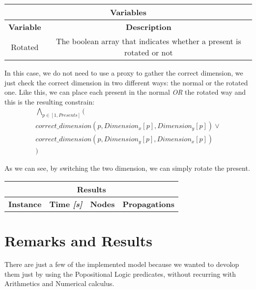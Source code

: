 \begin{center}
    \begin{tabular}{|c|c|}
        \hline
        \multicolumn{2}{|c|}{\textbf{Variables}} \\
        \hline
        \textbf{Variable} & {\textbf{Description}} \\
        \hline
        Rotated & The boolean array that indicates whether a present is rotated or not \\
        \hline
    \end{tabular}
\end{center}

In this case, we do not need to use a proxy to gather the correct dimension, we just check the correct dimension in two different ways: the normal or the rotated one.
Like this, we can place each present in the normal \textit{OR} the rotated way and this is the resulting constrain: 
\begin{equation*}\begin{multlined}
    \bigwedge_{p \in [1, Presents]} (\\
        correct\_dimension(p, Dimension_x[p], Dimension_y[p]) \vee\\
        correct\_dimension(p, Dimension_y[p], Dimension_x[p]) \\
    )
\end{multlined}\end{equation*}  

As we can see, by switching the two dimension, we can simply rotate the present.


\begin{center}
    \begin{tabular}{|c|c|c|c|}
        \hline
        \multicolumn{4}{|c|}{\textbf{Results}} \\
        \hline
        \textbf{Instance} & \textbf{Time \textit{[s]}} & \textbf{Nodes} & \textbf{Propagations} \\
        \hline
    \end{tabular}
\end{center}

\section{Remarks and Results}
There are just a few of the implemented model because we wanted to devolop them just by using the Popositional Logic predicates, without recurring with Arithmetics
and Numerical calculus.\\

